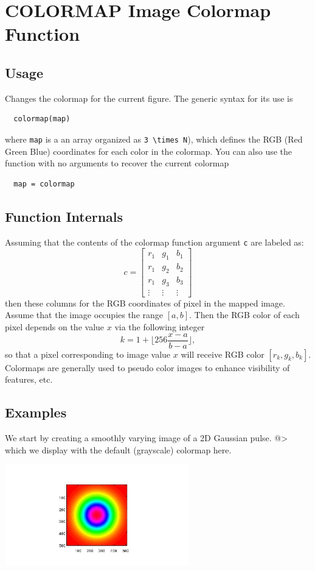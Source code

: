 \section{COLORMAP Image Colormap Function}

\subsection{Usage}

Changes the colormap for the current figure.  The generic syntax 
for its use is
\begin{verbatim}
  colormap(map)
\end{verbatim}
where \verb|map| is a an array organized as \verb|3 \times N|),
which defines the RGB (Red Green Blue) coordinates for each color in the
colormap.  You can also use the function with no arguments to recover
the current colormap
\begin{verbatim}
  map = colormap
\end{verbatim}
\subsection{Function Internals}

Assuming that the contents of the colormap function argument \verb|c| are 
labeled as:
\[
  c = \begin{bmatrix}
    r_1 & g_1 & b_1 \\
    r_1 & g_2 & b_2 \\
    r_1 & g_3 & b_3 \\
    \vdots & \vdots & \vdots 
      \end{bmatrix} 
\]
then these columns for the RGB coordinates of pixel in the mapped image.
Assume that the image occupies the range $[a,b]$.  Then the RGB color 
of each pixel depends on the value $x$ via the following integer
\[
  k = 1 + \lfloor 256 \frac{x-a}{b-a} \rfloor,
\]
so that a pixel corresponding to image value $x$ will receive RGB color 
$[r_k,g_k,b_k]$.
Colormaps are generally used to pseudo color images to enhance 
visibility of features, etc.
\subsection{Examples}

We start by creating a smoothly varying image of a 2D Gaussian pulse.
@>
which we display with the default (grayscale) colormap here.


\centerline{\includegraphics[width=8cm]{colormap1}}


